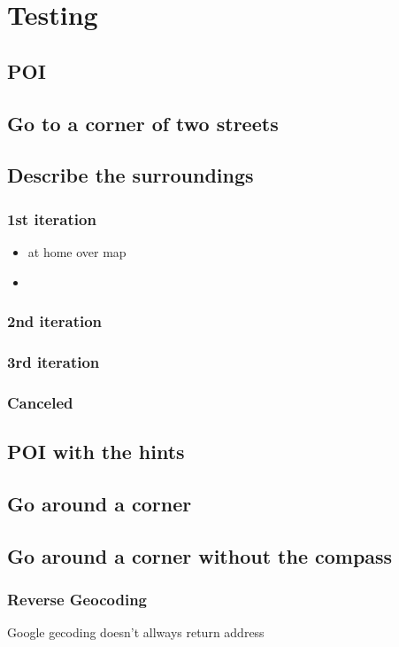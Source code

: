 \documentclass[11pt,oneside,a4paper]{book}
\begin{document}
	\chapter{Testing}
		\section{POI}		
		\section{Go to a corner of two streets}		
		\section{Describe the surroundings}
			\subsection{1st iteration}
				\begin{itemize}
					\item at home over map
					\item 
				\end{itemize}
			\subsection{2nd iteration}			
			\subsection{3rd iteration}	
		\subsection{Canceled}		
		\section{POI with the hints}
		\section{Go around a corner}
		\section{Go around a corner without the compass}				
		\subsection{Reverse Geocoding}
			Google gecoding doesn't allways return address
		
\end{document}
